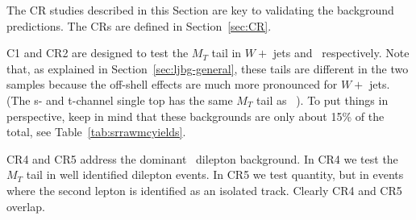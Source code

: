 The CR studies described in this Section are key to validating the
background predictions.  The CRs are defined in Section~\ref{sec:CR}.

C1 and CR2 are designed to test the $M_T$ tail in $W +$ jets and 
\ttbar\ respectively.  Note that, as explained in Section~\ref{sec:ljbg-general},
these tails are different in the two samples because the off-shell effects
are much more pronounced for $W +$ jets.  (The s- and t-channel single 
top has the same $M_T$ tail as \ttbar\ ).  To put things in perspective, 
keep in mind that these
backgrounds are only about 15\% of the total, see Table~\ref{tab:srrawmcyields}.

CR4 and CR5 address the dominant \ttbar\ dilepton background.
In CR4 we test the $M_T$ tail in well identified dilepton events.
In CR5 we test quantity, but in events where the second lepton is identified
as an isolated track.  Clearly CR4 and CR5 overlap.